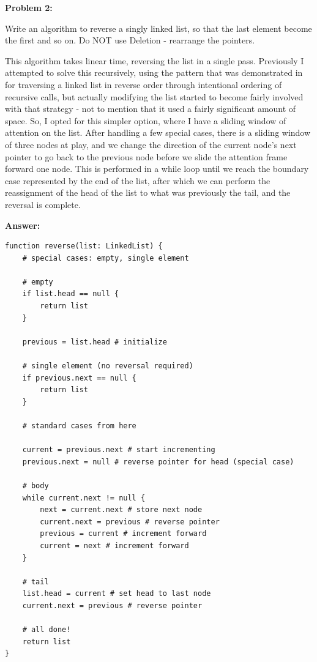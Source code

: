 \documentclass[10pt,letterpaper,final]{report}
\begin{document}
\pagebreak

\noindent\textbf{Problem 2:}

Write an algorithm to reverse a singly linked list, so that the last element become the first and so on. Do NOT use Deletion - rearrange the pointers.

This algorithm takes linear time, reversing the list in a single pass. Previously I attempted to solve this recursively, using the pattern that was demonstrated in \cite{zybooks-ds2026} for traversing a linked list in reverse order through intentional ordering of recursive calls, but actually modifying the list started to become fairly involved with that strategy - not to mention that it used a fairly significant amount of space. So, I opted for this simpler option, where I have a sliding window of attention on the list. After handling a few special cases, there is a sliding window of three nodes at play, and we change the direction of the current node's next pointer to go back to the previous node before we slide the attention frame forward one node. This is performed in a while loop until we reach the boundary case represented by the end of the list, after which we can perform the reassignment of the head of the list to what was previously the tail, and the reversal is complete.

\medskip
\noindent\textbf{Answer:}

\begin{mdframed}
  \begin{verbatim}
function reverse(list: LinkedList) {
    # special cases: empty, single element
    
    # empty
    if list.head == null {
        return list
    }

    previous = list.head # initialize
    
    # single element (no reversal required)
    if previous.next == null {
        return list
    } 
    
    # standard cases from here

    current = previous.next # start incrementing
    previous.next = null # reverse pointer for head (special case)
    
    # body
    while current.next != null {   
        next = current.next # store next node
        current.next = previous # reverse pointer
        previous = current # increment forward
        current = next # increment forward
    }

    # tail
    list.head = current # set head to last node
    current.next = previous # reverse pointer
    
    # all done!
    return list
}
\end{verbatim}
\end{mdframed}
\end{document}
